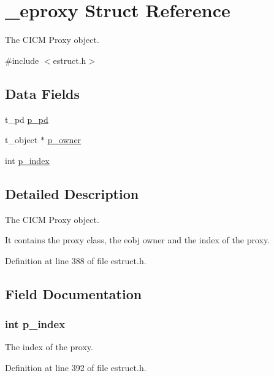 \hypertarget{struct__eproxy}{\section{\-\_\-eproxy Struct Reference}
\label{struct__eproxy}
}


The C\-I\-C\-M Proxy object.  




{\ttfamily \#include $<$estruct.\-h$>$}

\subsection*{Data Fields}
\begin{DoxyCompactItemize}
\item 
t\-\_\-pd \hyperlink{struct__eproxy_a818a512bafab5b368d1fa0bca9872451}{p\-\_\-pd}
\item 
t\-\_\-object $\ast$ \hyperlink{struct__eproxy_aafbddf848d70a14ab336be2b19cc535f}{p\-\_\-owner}
\item 
int \hyperlink{struct__eproxy_adf4f65c8db21f49ab60d62fedcfa9192}{p\-\_\-index}
\end{DoxyCompactItemize}


\subsection{Detailed Description}
The C\-I\-C\-M Proxy object. 

It contains the proxy class, the eobj owner and the index of the proxy. 

Definition at line 388 of file estruct.\-h.



\subsection{Field Documentation}
\hypertarget{struct__eproxy_adf4f65c8db21f49ab60d62fedcfa9192}{
\subsubsection[{p\-\_\-index}]{\setlength{\rightskip}{0pt plus 5cm}int p\-\_\-index}}\label{struct__eproxy_adf4f65c8db21f49ab60d62fedcfa9192}
The index of the proxy. 

Definition at line 392 of file estruct.\-h.

